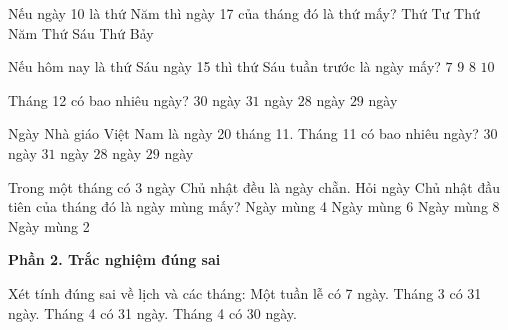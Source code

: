 \begin{ex} %
Nếu ngày 10 là thứ Năm thì ngày 17 của tháng đó là thứ mấy?
\choice
{Thứ Tư}
{\True Thứ Năm}
{Thứ Sáu}
{Thứ Bảy}
\end{ex}

\begin{ex} %
Nếu hôm nay là thứ Sáu ngày 15 thì thứ Sáu tuần trước là ngày mấy?
\choice
{$7$}
{$9$}
{\True $8$}
{$10$}
\end{ex}

\begin{ex} %
Tháng 12 có bao nhiêu ngày?
\choice
{$30$ ngày}
{\True $31$ ngày}
{$28$ ngày}
{$29$ ngày}
\end{ex}

\begin{ex} %
Ngày Nhà giáo Việt Nam là ngày 20 tháng 11. Tháng 11 có bao nhiêu ngày?
\choice
{\True $30$ ngày}
{$31$ ngày}
{$28$ ngày}
{$29$ ngày}
\end{ex}

\begin{ex} %
Trong một tháng có 3 ngày Chủ nhật đều là ngày chẵn. Hỏi ngày Chủ nhật đầu tiên của tháng đó là ngày mùng mấy?
\choice
{Ngày mùng 4}
{Ngày mùng 6}
{Ngày mùng 8}
{\True Ngày mùng 2}
\end{ex}

\textbf{Phần 2. Trắc nghiệm đúng sai}

\begin{ex} %
Xét tính đúng sai về lịch và các tháng:
\choiceTF
{\True Một tuần lễ có 7 ngày.}
{\True Tháng 3 có 31 ngày.}
{Tháng 4 có 31 ngày.}
{\True Tháng 4 có 30 ngày.}
\end{ex}

